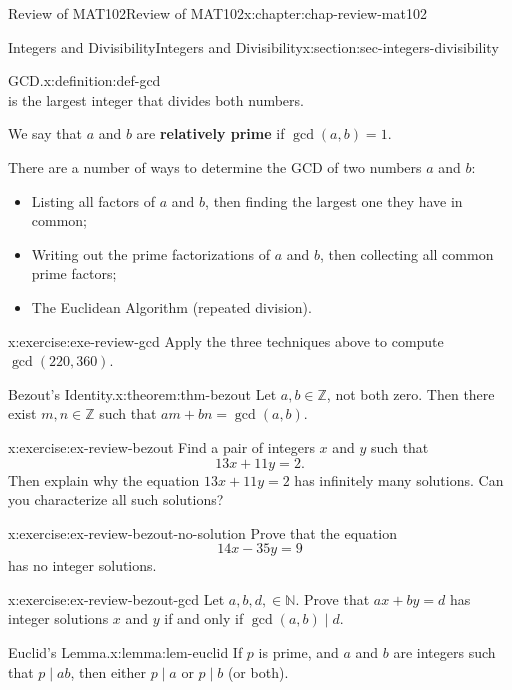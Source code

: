 \documentclass[oneside,10pt,]{book}
\newcommand{\terminology}[1]{\textbf{#1}}
\numberwithin{equation}{section}
\begin{document}
\begin{chapterptx}{Review of MAT102}{}{Review of MAT102}{}{}{x:chapter:chap-review-mat102}
\begin{sectionptx}{Integers and Divisibility}{}{Integers and Divisibility}{}{}{x:section:sec-integers-divisibility}
\begin{definition}{GCD.}{x:definition:def-gcd}
\begin{equation*}
\end{equation*}
is the largest integer that divides both numbers.%
\par
We say that \(a\) and \(b\) are \terminology{relatively prime} if \(\gcd(a,b) = 1\).%
\end{definition}
There are a number of ways to determine the GCD of two numbers \(a\) and \(b\):%
\begin{itemize}[label=\textbullet]
\item{}Listing all factors of \(a\) and \(b\), then finding the largest one they have in common;%
\item{}Writing out the prime factorizations of \(a\) and \(b\), then collecting all common prime factors;%
\item{}The Euclidean Algorithm (repeated division).%
\end{itemize}
%
\begin{inlineexercise}{}{x:exercise:exe-review-gcd}%
Apply the three techniques above to compute \(\gcd(220,360)\).%
\end{inlineexercise}
\begin{theorem}{Bezout's Identity.}{}{x:theorem:thm-bezout}%
Let \(a,b \in \mathbb{Z}\), not both zero. Then there exist \(m,n \in \mathbb{Z}\) such that \(am + bn = \gcd(a,b)\).%
\end{theorem}
\begin{inlineexercise}{}{x:exercise:ex-review-bezout}%
Find a pair of integers \(x\) and \(y\) such that%
\begin{equation*}
13x + 11y = 2\text{.}
\end{equation*}
Then explain why the equation \(13x + 11y = 2\) has infinitely many solutions. Can you characterize all such solutions?%
\end{inlineexercise}
\begin{inlineexercise}{}{x:exercise:ex-review-bezout-no-solution}%
Prove that the equation%
\begin{equation*}
14x - 35y = 9
\end{equation*}
has no integer solutions.%
\end{inlineexercise}
\begin{inlineexercise}{}{x:exercise:ex-review-bezout-gcd}%
Let \(a, b, d, \in \mathbb{N}\). Prove that \(ax + by = d\) has integer solutions \(x\) and \(y\) if and only if \(\gcd(a,b) \mid d\).%
\end{inlineexercise}
\begin{lemma}{Euclid's Lemma.}{}{x:lemma:lem-euclid}%
If \(p\) is prime, and \(a\) and \(b\) are integers such that \(p \mid ab\), then either \(p \mid a\) or \(p \mid b\) (or both).%

\end{lemma}
\end{sectionptx}
\end{chapterptx}
\end{document}
